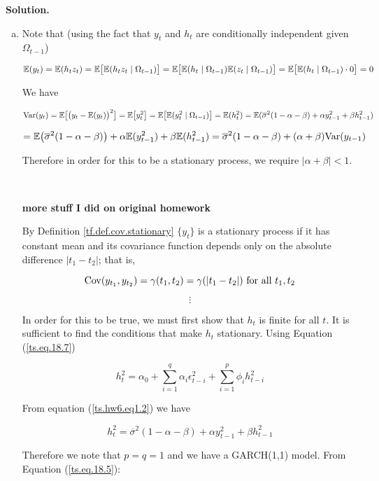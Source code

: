 \textbf{Solution.} \begin{enumerate}[(a)]

\item

Note that (using the fact that \(y_t\) and \(h_t\) are conditionally independent given \(\Omega_{t-1}\))

\[
\E(y_t) = \E(h_t z_t) = \E \big[ \E(h_t z_t \mid \Omega_{t-1}) \big] = \E \big[ \E(h_t \mid \Omega_{t-1}) \E(z_t \mid \Omega_{t-1}) \big] = \E \big[ \E(h_t \mid \Omega_{t-1})\cdot 0 \big] = 0 
\]

We have

\[
\Var(y_t) = \E\big[ \big(y_t - \E(y_t)\big)^2\big] = \E\big[y_t^2\big] = \E\big[ \E(y_t^2 \mid \Omega_{t-1})\big] = \E(h_t^2) = \E(\overline{\sigma}^2(1 - \alpha - \beta) + \alpha y_{t-1}^2 + \beta h_{t-1}^2 )
\]

\[
= \E\big(\overline{\sigma}^2(1 - \alpha - \beta) \big) + \alpha  \E(y_{t-1}^2 )+ \beta \E( h_{t-1}^2 ) = \overline{\sigma}^2(1 - \alpha - \beta) +( \alpha + \beta) \Var( y_{t-1})
\]

Therefore in order for this to be a stationary process, we require \( \boxed{|\alpha + \beta| <1}\).

\

\textbf{more stuff I did on original homework}

By Definition \ref{tf.def.cov.stationary} \(\{y_t\}\) is a stationary process if it has constant mean and its covariance function depends only on the absolute difference \(|t_1 - t_2|\); that is,

\[
\Cov(y_{t_1}, y_{t_2}) = \gamma(t_1, t_2) = \gamma(|t_1 - t_2|) \text{ for all } t_1, t_2
\]

\[
\vdots
\]

In order for this to be true, we must first show that \(h_t\) is finite for all \(t\). It is sufficient to find the conditions that make \(h_t\) stationary. Using Equation (\ref{ts.eq.18.7})

\[
h_t^2 =\alpha_0 + \sum_{i=1}^q \alpha_i \epsilon_{t-i}^2 + \sum_{i=1}^p \phi_i h_{t-i}^2
\]

From equation (\ref{ts.hw6.eq1.2}) we have

\[
h_t^2 = \overline{\sigma}^2(1 - \alpha - \beta) + \alpha y_{t-1}^2 + \beta h_{t-1}^2
\]

Therefore we note that \(p = q = 1\) and we have a GARCH(1,1) model. From Equation (\ref{ts.eq.18.5}):


\end{enumerate}
